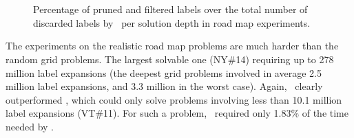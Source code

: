 \begin{figure}
    \begin{center}
%
      \\ %
      \\ %
    \end{center}
    \vspace{-0.25in} 
    \caption{%
Percentage of pruned and filtered labels over the total number of discarded labels by \namoate \ per solution depth in road map experiments.  
    }%
    \label{fig:7-4}

\end{figure}

The experiments on the realistic road map problems are much harder than the random grid problems. The largest solvable one (NY\#14) requiring up to 278 million label expansions (the deepest grid problems involved in average 2.5 million label expansions, and 3.3 million in the worst case). Again, \namoate \ clearly outperformed \namoalin, which could only solve problems involving less than 10.1 million label expansions (VT\#11). For such a problem, \namoate \ required only 1.83\% of the time needed by \namoalin. 

